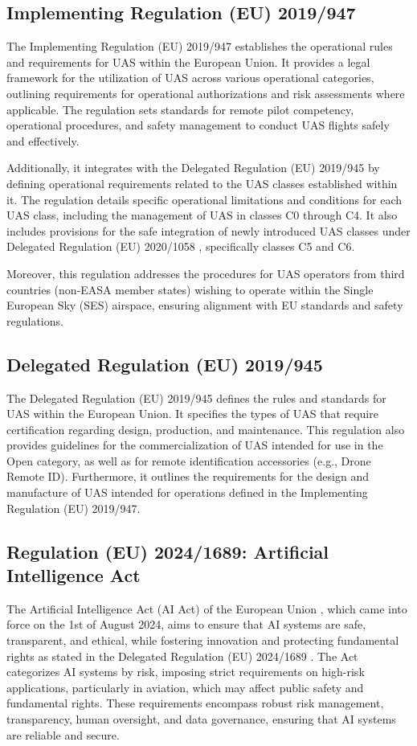 \subsection{Implementing Regulation (EU) 2019/947}
The Implementing Regulation (EU) 2019/947 \autocite{eu-947-2019} establishes the operational rules and requirements for UAS within the European Union. It provides a legal framework for the utilization of UAS across various operational categories, outlining requirements for operational authorizations and risk assessments where applicable. The regulation sets standards for remote pilot competency, operational procedures, and safety management to conduct UAS flights safely and effectively.

Additionally, it integrates with the Delegated Regulation (EU) 2019/945 \autocite{eu-945-2019} by defining operational requirements related to the UAS classes established within it. The regulation details specific operational limitations and conditions for each UAS class, including the management of UAS in classes C0 through C4. It also includes provisions for the safe integration of newly introduced UAS classes under Delegated Regulation (EU) 2020/1058 \autocite{eu-1058-2020}, specifically classes C5 and C6.

Moreover, this regulation addresses the procedures for UAS operators from third countries (non-EASA member states) wishing to operate within the Single European Sky (SES) airspace, ensuring alignment with EU standards and safety regulations.

\subsection{Delegated Regulation (EU) 2019/945}
The Delegated Regulation (EU) 2019/945 \autocite{eu-945-2019} defines the rules and standards for UAS within the European Union. It specifies the types of UAS that require certification regarding design, production, and maintenance. This regulation also provides guidelines for the commercialization of UAS intended for use in the Open category, as well as for remote identification accessories (e.g., Drone Remote ID). Furthermore, it outlines the requirements for the design and manufacture of UAS intended for operations defined in the Implementing Regulation (EU) 2019/947.

\subsection{Regulation (EU) 2024/1689: Artificial Intelligence Act}
The Artificial Intelligence Act (AI Act) of the European Union \autocite{AIActIntoForce}, which came into force on the 1st of August 2024, aims to ensure that AI systems are safe, transparent, and ethical, while fostering innovation and protecting fundamental rights as stated in the Delegated Regulation (EU) 2024/1689 \autocite{eu-1689-2024}. The Act categorizes AI systems by risk, imposing strict requirements on high-risk applications, particularly in aviation, which may affect public safety and fundamental rights. These requirements encompass robust risk management, transparency, human oversight, and data governance, ensuring that AI systems are reliable and secure.

